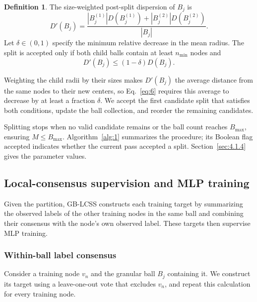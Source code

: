 \documentclass[times,review,10pt]{elsarticle}
\theoremstyle{definition}
\newtheorem{definition}{Definition}
\theoremstyle{plain}
\begin{document}
\begin{definition}
The size-weighted post-split dispersion of \(B_j\) is
\begin{equation}\label{eq:5}
D'(B_j) = \frac{|B_j^{(1)}|D(B_j^{(1)}) + |B_j^{(2)}|D(B_j^{(2)})}{|B_j|}.
\end{equation}
Let \(\delta \in (0,1)\) specify the minimum relative decrease in the mean radius. The split is accepted only if both child balls contain at least \(n_{\min}\) nodes and
\begin{equation}\label{eq:6}
D'(B_j) \leq (1 - \delta)D(B_j).
\end{equation}
\end{definition}

Weighting the child radii by their sizes makes \(D'(B_j)\) the average distance from the same nodes to their new centers, so Eq.~\eqref{eq:6} requires this average to decrease by at least a fraction \(\delta\). We accept the first candidate split that satisfies both conditions, update the ball collection, and reorder the remaining candidates.

Splitting stops when no valid candidate remains or the ball count reaches \(B_{\max}\), ensuring \(M\leq B_{\max}\). Algorithm~\ref{alg:1} summarizes the procedure; its Boolean flag \(\mathrm{accepted}\) indicates whether the current pass accepted a split. Section~\ref{sec:4.1.4} gives the parameter values.



\subsection{Local-consensus supervision and MLP training}\label{sec:3.3}

Given the partition, GB-LCSS constructs each training target by summarizing the observed labels of the other training nodes in the same ball and combining their consensus with the node's own observed label. These targets then supervise MLP training.

\subsubsection{Within-ball label consensus}\label{sec:3.3.1}

Consider a training node \(v_n\) and the granular ball \(B_j\) containing it. We construct its target using a leave-one-out vote that excludes \(v_n\), and repeat this calculation for every training node.
\end{document}
